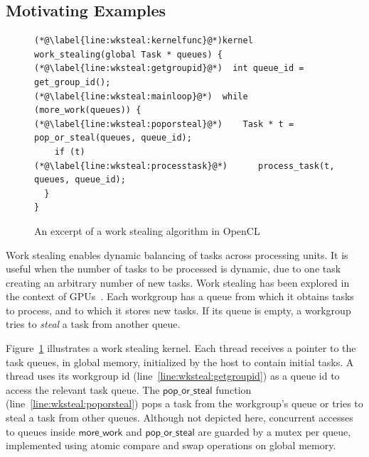 \documentclass[sigconf]{acmart}
\newcommand{\ADComment}[1]{\textcolor{green}{AD: #1}}
\newcommand{\myfiglong}{Figure~}
\begin{document}
\subsection{Motivating Examples}\label{sec:openclexamples}


\begin{figure}[t]



\begin{lstlisting}
(*@\label{line:wksteal:kernelfunc}@*)kernel work_stealing(global Task * queues) {
(*@\label{line:wksteal:getgroupid}@*)  int queue_id = get_group_id();
(*@\label{line:wksteal:mainloop}@*)  while (more_work(queues)) {
(*@\label{line:wksteal:poporsteal}@*)    Task * t = pop_or_steal(queues, queue_id);
    if (t)
(*@\label{line:wksteal:processtask}@*)      process_task(t, queues, queue_id);
  }
}
\end{lstlisting}
\caption{An excerpt of a work stealing algorithm in OpenCL}\label{fig:workstealing}
\end{figure}


%
Work stealing enables dynamic balancing of tasks across
processing units. It is useful when the number of tasks to be
processed is dynamic, due to one task creating an arbitrary number of
new tasks.  Work stealing has been explored in the context of
GPUs~\cite{DBLP:conf/egh/CedermanT08,TPO10}. Each workgroup has a
queue from which it obtains tasks to process, and to which
it stores new tasks. If its queue is empty, a workgroup
tries to \emph{steal} a task from another queue.

\myfiglong\ref{fig:workstealing} illustrates a work stealing
kernel. Each thread receives a pointer to the task queues, in global
memory, initialized by the host to contain initial tasks. A thread
uses its workgroup id (line~\ref{line:wksteal:getgroupid}) as a queue
id to access the relevant task queue. The $\mathsf{pop\_or\_steal}$
function (line~\ref{line:wksteal:poporsteal}) pops a task from the
workgroup's queue or tries to steal a task from other queues. Although
not depicted here, concurrent accesses to queues inside
$\mathsf{more\_work}$ and $\mathsf{pop\_or\_steal}$ are guarded by a
mutex per queue, implemented using atomic compare and swap operations
on global memory. 
\end{document}
